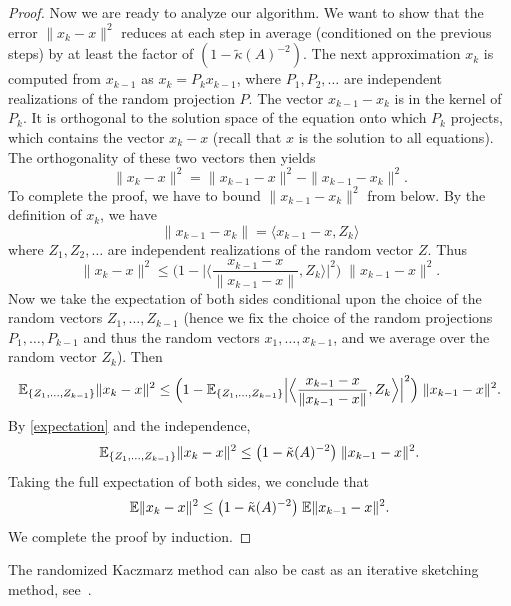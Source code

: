 \begin{proof}
Now we are ready to analyze our algorithm. We want to show that
the error $\|x_k - x\|^2$ reduces at each step in average
(conditioned on the previous steps) by at least the factor
of $(1 - \tilde{\kappa}(A)^{-2})$.
The next approximation $x_k$ is computed from $x_{k-1}$ as
$x_k = P_k x_{k-1}$, where $P_1, P_2, \ldots$ are independent realizations
of the random projection $P$.
The vector $x_{k-1} - x_k$ is in the kernel of $P_k$. It is
orthogonal to the solution space of the equation onto which $P_k$
projects, which contains the vector $x_k - x$ (recall that $x$ is the
solution to all equations). The orthogonality of these two vectors then yields
$$
\|x_k - x\|^2 = \|x_{k-1} - x\|^2 - \|x_{k-1} - x_k\|^2.
$$
To complete the proof, we have to bound $\|x_{k-1} - x_k\|^2$ from below.
By the definition of $x_k$, we have
$$
\|x_{k-1} - x_k\|  =  \langle x_{k-1} - x, Z_k \rangle
$$
where $Z_1, Z_2, \ldots$ are independent realizations of the random vector $Z$.
Thus
$$
\|x_k - x\|^2
\le \Big( 1 - \Big| \Big\langle \frac{x_{k-1} - x}{\|x_{k-1} - x\|},
                  Z_k
                  \Big\rangle \Big|^2 \Big)
  \;\|x_{k-1} - x\|^2.
$$
Now we take the expectation of both sides conditional upon
the choice of the random vectors $Z_1, \ldots, Z_{k-1}$
(hence we fix the choice of the random projections $P_1, \ldots, P_{k-1}$ and
thus the random vectors $x_1, \ldots, x_{k-1}$, and we average over the
random vector $Z_k$). Then
$$
\mathbb{E}_{\{Z_1,\ldots,Z_{k-1}\}}  \|x_k - x\|^2
\le \Big( 1 - \mathbb{E}_{\{Z_1,\ldots,Z_{k-1}\}}
                     \Big| \Big\langle \frac{x_{k-1} - x}{\|x_{k-1} - x\|},
                     Z_k
                     \Big\rangle \Big|^2 \Big)
  \; \|x_{k-1} - x\|^2.
$$
By \eqref{expectation} and the independence,
$$
\mathbb{E}_{\{Z_1,\ldots,Z_{k-1}\}}  \|x_k - x\|^2
\le   \big( 1 - \tilde{\kappa}(A)^{-2} \big) \; \|x_{k-1} - x\|^2.
$$
Taking the full expectation of both sides, we conclude that
$$
\mathbb{E} \|x_k - x\|^2
\le   \big( 1 - \tilde{\kappa}(A)^{-2} \big) \; \mathbb{E} \|x_{k-1} - x\|^2.$$
We complete the proof by induction.

\end{proof}

The randomized Kaczmarz method can also be
cast as an iterative sketching method, see~\cite{gower2015randomized}.

